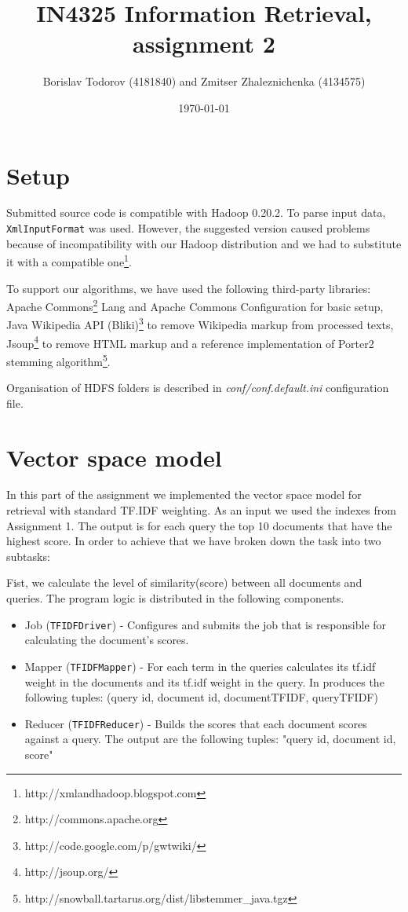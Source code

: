 \documentclass[a4paper, notitlepage]{report}
\begin{document}
\title{IN4325 Information Retrieval, assignment 2}
\author{Borislav Todorov (4181840) and Zmitser Zhaleznichenka (4134575)}
\date{\today}
\maketitle

\section{Setup}

Submitted source code is compatible with Hadoop 0.20.2. To parse input data, \lstinline{XmlInputFormat} was used. However, the suggested version caused problems because of incompatibility with our Hadoop distribution and we had to substitute it with a compatible one\footnote{http://xmlandhadoop.blogspot.com}.

To support our algorithms, we have used the following third-party libraries: Apache Commons\footnote{http://commons.apache.org} Lang and Apache Commons Configuration for basic setup, Java Wikipedia API (Bliki)\footnote{http://code.google.com/p/gwtwiki/} to remove Wikipedia markup from processed texts, Jsoup\footnote{http://jsoup.org/} to remove HTML markup and a reference implementation of Porter2 stemming algorithm\footnote{http://snowball.tartarus.org/dist/libstemmer\_java.tgz}.

Organisation of HDFS folders is described in \emph{conf/conf.default.ini} configuration file.

\section{Vector space model}
In this part of the assignment we implemented the vector space model for retrieval with standard TF.IDF weighting. As an input we used the indexes from Assignment 1. The output is for each query the top 10 documents that have the highest score. In order to achieve that we have broken down the task into two subtasks:

Fist, we calculate the level of similarity(score) between all documents and queries. The program logic is distributed in the following components.

\begin{itemize}
	\item Job (\lstinline{TFIDFDriver}) - Configures and submits the job that is responsible for calculating the document's scores.
	\item Mapper (\lstinline{TFIDFMapper}) - For each term in the queries calculates its tf.idf weight in the documents and its tf.idf weight in the query. In produces the following tuples: (query id, document id, documentTFIDF, queryTFIDF)
	\item Reducer (\lstinline{TFIDFReducer}) - Builds the scores that each document scores against a query. The output are the following tuples: "query id, document id, score"  
\end{itemize}
\end{document}
